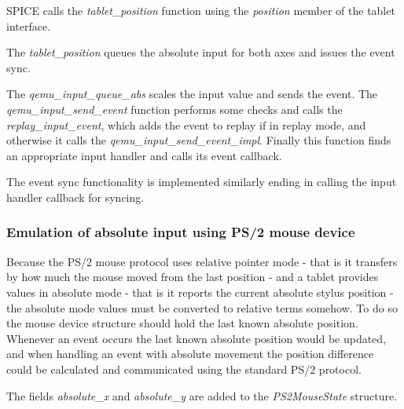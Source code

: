 SPICE calls the \emph{tablet\_position} function using the \emph{position}
member of the tablet interface.

\begin{codeblock}
    
\end{codeblock}

The \emph{tablet\_position} queues the absolute input for both axes and issues
the event sync.

The \emph{qemu\_input\_queue\_abs} scales the input value and sends the event.
The \emph{qemu\_input\_send\_event} function performs some checks and calls the
\emph{replay\_input\_event}, which adds the event to replay if in replay mode,
and otherwise it calls the \emph{qemu\_input\_send\_event\_impl}.  Finally this
function finds an appropriate input handler and calls its event callback.

\begin{codeblock}
    
    
    
\end{codeblock}

\noindent
The event sync functionality is implemented similarly ending in calling the
input handler callback for syncing.

\subsubsection{Emulation of absolute input using PS/2 mouse device}

Because the PS/2 mouse protocol uses relative pointer mode - that is it
transfers by how much the mouse moved from the last position - and a tablet
provides values in absolute mode - that is it reports the current absolute
stylus position - the absolute mode values must be converted to relative terms
somehow.  To do so the mouse device structure should hold the last known
absolute position.  Whenever an event occurs the last known absolute position
would be updated, and when handling an event with absolute movement the position
difference could be calculated and communicated using the standard PS/2
protocol.

The fields \emph{absolute\_x} and \emph{absolute\_y} are added to the
\emph{PS2MouseState} structure.

